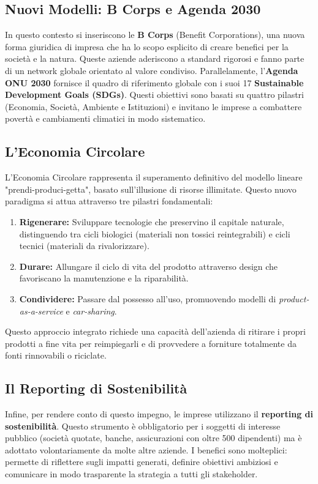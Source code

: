 \documentclass[a4paper,10pt]{article}
\begin{document}
\subsection*{Nuovi Modelli: B Corps e Agenda 2030}

In questo contesto si inseriscono le \textbf{B Corps} (Benefit Corporations), una nuova forma giuridica di impresa che ha lo scopo esplicito di creare benefici per la società e la natura. Queste aziende aderiscono a standard rigorosi e fanno parte di un network globale orientato al valore condiviso. 
Parallelamente, l'\textbf{Agenda ONU 2030} fornisce il quadro di riferimento globale con i suoi 17 \textbf{Sustainable Development Goals (SDGs)}. Questi obiettivi sono basati su quattro pilastri (Economia, Società, Ambiente e Istituzioni) e invitano le imprese a combattere povertà e cambiamenti climatici in modo sistematico.

\subsection*{L'Economia Circolare}

L'Economia Circolare rappresenta il superamento definitivo del modello lineare "prendi-produci-getta", basato sull'illusione di risorse illimitate. Questo nuovo paradigma si attua attraverso tre pilastri fondamentali:
\begin{enumerate}
    \item \textbf{Rigenerare:} Sviluppare tecnologie che preservino il capitale naturale, distinguendo tra cicli biologici (materiali non tossici reintegrabili) e cicli tecnici (materiali da rivalorizzare).
    \item \textbf{Durare:} Allungare il ciclo di vita del prodotto attraverso design che favoriscano la manutenzione e la riparabilità.
    \item \textbf{Condividere:} Passare dal possesso all'uso, promuovendo modelli di \textit{product-as-a-service} e \textit{car-sharing}.
\end{enumerate}
Questo approccio integrato richiede una capacità dell'azienda di ritirare i propri prodotti a fine vita per reimpiegarli e di provvedere a forniture totalmente da fonti rinnovabili o riciclate.

\subsection*{Il Reporting di Sostenibilità}

Infine, per rendere conto di questo impegno, le imprese utilizzano il \textbf{reporting di sostenibilità}. Questo strumento è obbligatorio per i soggetti di interesse pubblico (società quotate, banche, assicurazioni con oltre 500 dipendenti) ma è adottato volontariamente da molte altre aziende. I benefici sono molteplici: permette di riflettere sugli impatti generati, definire obiettivi ambiziosi e comunicare in modo trasparente la strategia a tutti gli stakeholder.
\end{document}
